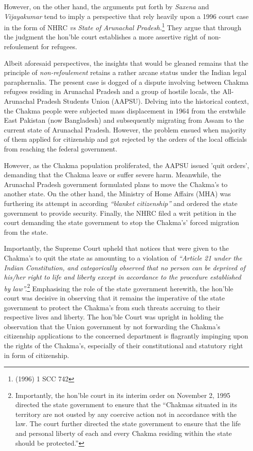 \begin{multicols}{2}
\noi
However, on the other hand, the arguments put forth by \textit{Saxena} and \textit{Vijayakumar} tend to
imply a perspective that rely heavily upon a 1996 court case in the form of NHRC \textit{vs State of
Arunachal Pradesh.}\footnote{(1996) 1 SCC 742} They argue that through the judgment the hon’ble court establishes a
more assertive right of non-refoulement for refugees.

\noi
Albeit aforesaid perspectives, the insights that would be gleaned remains that the principle of
\textit{non-refoulement} retains a rather arcane status under the Indian legal paraphernalia. The
present case is dogged of a dispute involving between Chakma refugees residing in
Arunachal Pradesh and a group of hostile locals, the All-Arunachal Pradesh Students Union
(AAPSU). Delving into the historical context, the Chakma people were subjected mass
displacement in 1964 from the erstwhile East Pakistan (now Bangladesh) and subsequently
migrating from Assam to the current state of Arunachal Pradesh. However, the problem
ensued when majority of them applied for citizenship and got rejected by the orders of the
local officials from reaching the federal government.

\noi
However, as the Chakma population proliferated, the AAPSU issued 'quit orders', demanding
that the Chakma leave or suffer severe harm. Meanwhile, the Arunachal Pradesh government
formulated plans to move the Chakma’s to another state. On the other hand, the Ministry of
Home Affairs (MHA) was furthering its attempt in according \textit{“blanket citizenship”} and
ordered the state government to provide security. Finally, the NHRC filed a writ petition in
the court demanding the state government to stop the Chakma’s' forced migration from the
state.

\noi
Importantly, the Supreme Court upheld that notices that were given to the Chakma’s to quit
the state as amounting to a violation of \textit{“Article 21 under the Indian Constitution, and
categorically observed that no person can be deprived of his/her right to life and liberty
except in accordance to the procedure established by law”.}\footnote{Importantly, the hon’ble court in its interim order on November 2, 1995 directed the state government to ensure that the “Chakmas situated in its territory are not ousted by any coercive action not in accordance with the law. The court further directed the state government to ensure that the life and personal liberty of each and every Chakma residing within the state should be protected.”} Emphasising the role of the state government herewith, the hon’ble court was decisive in observing that it remains the
imperative of the state government to protect the Chakma’s from such threats accruing to
their respective lives and liberty. The hon’ble Court was upright in holding the observation
that the Union government by not forwarding the Chakma’s citizenship applications to the
concerned department is flagrantly impinging upon the rights of the Chakma’s, especially of
their constitutional and statutory right in form of citizenship.


\end{multicols}
